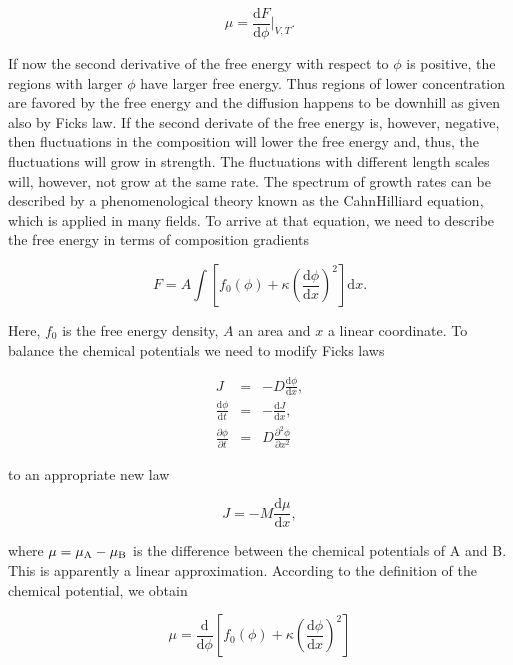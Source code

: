 \documentclass[letterpaper,10pt,english]{sphinxmanual}
\begin{document}
\sphinxAtStartPar
\begin{equation}
\mu=\frac{\mathrm dF}{\mathrm d\phi}|_{V,T}.
\end{equation}

\sphinxAtStartPar
If now the second derivative of the free energy with respect to \(\phi\) is positive, the regions with larger \(\phi\) have larger free energy. Thus regions of lower concentration are favored by the free energy and the diffusion happens to be downhill as given also by Ficks law. If the second derivate of the free energy is, however, negative, then fluctuations in the composition will lower the free energy and, thus, the fluctuations will grow in strength. The fluctuations with different
length scales will, however, not grow at the same rate. The spectrum of growth rates can be described by a phenomenological theory known as the Cahn\textendash{}Hilliard equation, which is applied in many fields. To arrive at that equation, we need to describe the free energy in terms of composition gradients

\sphinxAtStartPar
\begin{equation}
F=A\int \left [f_{0}(\phi)+\kappa \left( \frac{\mathrm d\phi}{\mathrm dx}\right)^2\right]\mathrm dx.
\end{equation}

\sphinxAtStartPar
Here, \(f_0\) is the free energy density, \(A\) an area and \(x\) a linear coordinate. To balance the chemical potentials we need to modify Ficks laws

\sphinxAtStartPar
\begin{eqnarray}
J &=& -D\frac{\mathrm d\phi}{\mathrm dx},\\ \frac{\mathrm d\phi}{\mathrm dt} &=& -\frac{\mathrm dJ}{\mathrm dx},\\ \frac{\partial\phi}{\partial t} &=& D\frac{\partial^{2}\phi}{\partial x^2}
\end{eqnarray}

\sphinxAtStartPar
to an appropriate new law

\sphinxAtStartPar
\begin{equation}
J=-M \frac{\mathrm d\mu}{\mathrm dx},
\end{equation}

\sphinxAtStartPar
where \(\mu=\mu_{\rm A}-\mu_{\rm B}\) is the difference between the chemical potentials of \(\mathrm{A}\) and \(\mathrm{B}\). This is apparently a linear approximation. According to the definition of the chemical potential, we obtain

\sphinxAtStartPar
\begin{equation}
\mu=\frac{\mathrm d}{\mathrm d\phi}\left [f_{0}(\phi)+\kappa \left( \frac{\mathrm d\phi}{\mathrm dx}\right)^2\right]
\end{equation}
\end{document}
